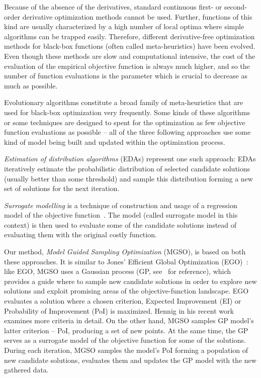 \documentclass{itatnew}
\begin{document}
Because of the absence of the derivatives, standard continuous first- or second-order derivative optimization methods cannot be used. Further, functions of this kind are usually characterized by a high number of local optima where simple algorithms can be trapped easily. Therefore, different derivative-free optimization methods for black-box functions (often called meta-heuristics) have been evolved. Even though these methods are slow and computational intensive, the cost of the evaluation of the empirical objective function is always much higher, and so the number of function evaluations is the parameter which is crucial to decrease as much as possible.

Evolutionary algorithms constitute a broad family of meta-heuristics that are used for black-box optimization very frequently. Some kinds of these algorithms or some techniques are designed to spent for the optimization as few objective function evaluations as possible -- all of the three following approaches use some kind of model being built and updated within the optimization process.

\emph{Estimation of distribution algorithms} (EDAs) \cite{larranaga_estimation_2002} represent one such approach: EDAs iteratively estimate the probabilistic distribution of selected candidate solutions (usually better than some threshold) and sample this distribution forming a new set of solutions for the next iteration. 

\emph{Surrogate modelling} is a technique of construction and usage of a regression model of the objective function~\cite{jin_comprehensive_2005}. The model (called surrogate model in this context) is then used to evaluate some of the candidate solutions instead of evaluating them with the original costly function.

Our method, \emph{Model Guided Sampling Optimization} (MGSO), is based on both these approaches. It is similar to Jones' Efficient Global Optimization (EGO)~\cite{jones_efficient_1998}: like EGO, MGSO uses a Gaussian process (GP, see~\cite{rasmussen_gaussian_2006} for reference), which provides a guide where to sample new candidate solutions in order to explore new solutions and exploit promising areas of the objective-function landscape. EGO evaluates a solution where a chosen criterion, Expected Improvement (EI) or Probability of Improvement (PoI) is maximized. Hennig in his recent work~\cite{hennig_entropy_2012} examines more criteria in detail. On the other hand, MGSO samples GP model's latter criterion -- PoI, producing a set of new points. At the same time, the GP serves as a surrogate model of the objective function for some of the solutions. During each iteration, MGSO samples the model's PoI forming a population of new candidate solutions, evaluates them and updates the GP model with the new gathered data.
\end{document}
